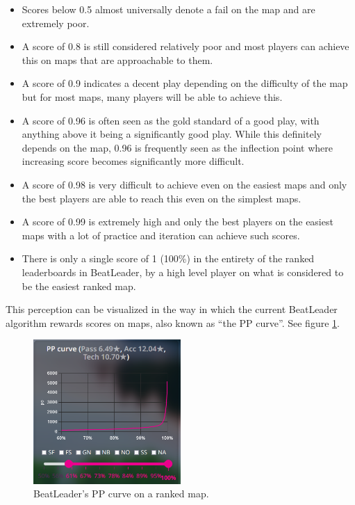 \documentclass[12pt,a4paper]{article}
\begin{document}
\begin{itemize}

\item Scores below 0.5 almost universally denote a fail on the map and are extremely poor.
\item A score of 0.8 is still considered relatively poor and most players can achieve this on maps that are approachable to them.
\item A score of 0.9 indicates a decent play depending on the difficulty of the map but for most maps, many players will be able to achieve this.
\item A score of 0.96 is often seen as the gold standard of a good play, with anything above it being a significantly good play. While this definitely depends on the map, 0.96 is frequently seen as the inflection point where increasing score becomes significantly more difficult.
\item A score of 0.98 is very difficult to achieve even on the easiest maps and only the best players are able to reach this even on the simplest maps.
\item A score of 0.99 is extremely high and only the best players on the easiest maps with a lot of practice and iteration can achieve such scores.
\item There is only a single score of 1 (100\%) in the entirety of the ranked leaderboards in BeatLeader, by a high level player on what is considered to be the easiest ranked map.

\end{itemize}

This perception can be visualized in the way in which the current BeatLeader algorithm rewards scores on maps, also known as ``the PP curve''. See figure \ref{PP_curve}.

\begin{figure}
\caption{\label{PP_curve}BeatLeader's PP curve on a ranked map.}
\includegraphics[width=0.5\textwidth]{PPcurve.png}
\centering
\end{figure}
\end{document}
